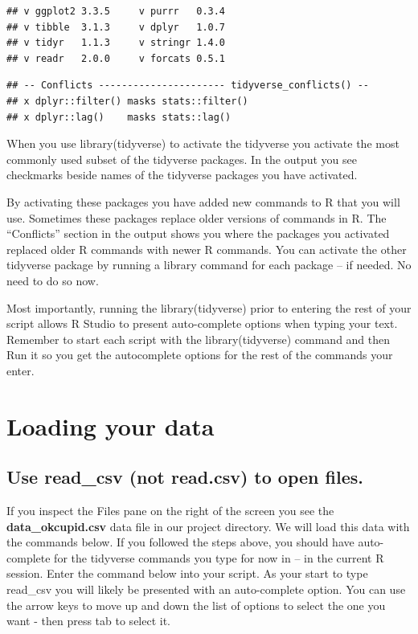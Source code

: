\documentclass[
]{krantz}
\begin{document}
\begin{verbatim}
## v ggplot2 3.3.5     v purrr   0.3.4
## v tibble  3.1.3     v dplyr   1.0.7
## v tidyr   1.1.3     v stringr 1.4.0
## v readr   2.0.0     v forcats 0.5.1
\end{verbatim}

\begin{verbatim}
## -- Conflicts ---------------------- tidyverse_conflicts() --
## x dplyr::filter() masks stats::filter()
## x dplyr::lag()    masks stats::lag()
\end{verbatim}

When you use library(tidyverse) to activate the tidyverse you activate the most commonly used subset of the tidyverse packages. In the output you see checkmarks beside names of the tidyverse packages you have activated.

By activating these packages you have added new commands to R that you will use. Sometimes these packages replace older versions of commands in R. The ``Conflicts'' section in the output shows you where the packages you activated replaced older R commands with newer R commands. You can activate the other tidyverse package by running a library command for each package -- if needed. No need to do so now.

Most importantly, running the library(tidyverse) prior to entering the rest of your script allows R Studio to present auto-complete options when typing your text. Remember to start each script with the library(tidyverse) command and then Run it so you get the autocomplete options for the rest of the commands your enter.

\hypertarget{loading-your-data}{%
\section{Loading your data}\label{loading-your-data}}

\hypertarget{use-read_csv-not-read.csv-to-open-files.}{%
\subsection{Use read\_csv (not read.csv) to open files.}\label{use-read_csv-not-read.csv-to-open-files.}}

If you inspect the Files pane on the right of the screen you see the \textbf{data\_okcupid.csv} data file in our project directory. We will load this data with the commands below. If you followed the steps above, you should have auto-complete for the tidyverse commands you type for now in -- in the current R session. Enter the command below into your script. As your start to type read\_csv you will likely be presented with an auto-complete option. You can use the arrow keys to move up and down the list of options to select the one you want - then press tab to select it.
\end{document}

